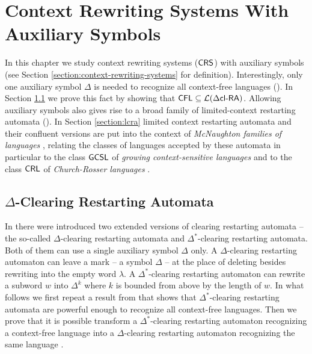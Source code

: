 \chapter{Context Rewriting Systems With Auxiliary Symbols}\label{chapter:crs_aux}

In this chapter we study context rewriting systems ($\textup{\sf CRS\/}$) with auxiliary symbols (see Section \ref{section:context-rewriting-systems} for definition). Interestingly, only one auxiliary symbol $\Delta$ is needed to recognize all context-free languages (\cite{CM11}). In Section \ref{section:dxclra} we prove this fact by showing that $\textup{\sf CFL} \subseteq {\cal L}(\textup{\sf $\Delta$cl-RA\/})$. Allowing auxiliary symbols also gives rise to a broad family of limited-context restarting automata (\cite{B11,OCM13}). In Section \ref{section:lcra} limited context restarting automata and their confluent versions are put into the context of \emph{McNaughton families of languages} \cite{Beaudry2003}, relating the classes of languages accepted by these automata in particular to the class $\textup{\sf GCSL}$ of \emph{growing context-sensitive languages} \cite{Buntrock19981,Dahlhaus1986} and to the class $\textup{\sf CRL}$ of \emph{Church-Rosser languages} \cite{MNO88}.

\section{$\Delta$-Clearing Restarting Automata}\label{section:dxclra}

In \cite{CM10} there were introduced two extended versions of clearing restarting automata -- the so-called $\Delta$-clearing restarting automata and $\Delta^*$-clearing restarting automata. Both of them can use a single auxiliary symbol $\Delta$ only. A $\Delta$-clearing restarting automaton can leave a mark -- a symbol $\Delta$ -- at the place of deleting besides rewriting into the empty word $\lambda$. A $\Delta^*$-clearing restarting automaton can rewrite a subword $w$ into $\Delta^k$ where $k$ is bounded from above by the length of $w$. In what follows we first repeat a result from \cite{CM10} that shows that $\Delta^*$-clearing restarting automata are powerful enough to recognize  all context-free languages. Then we prove that it is possible transform a $\Delta^*$-clearing restarting automaton recognizing a  context-free language into a $\Delta$-clearing restarting automaton recognizing the same language \cite{CM11}.

